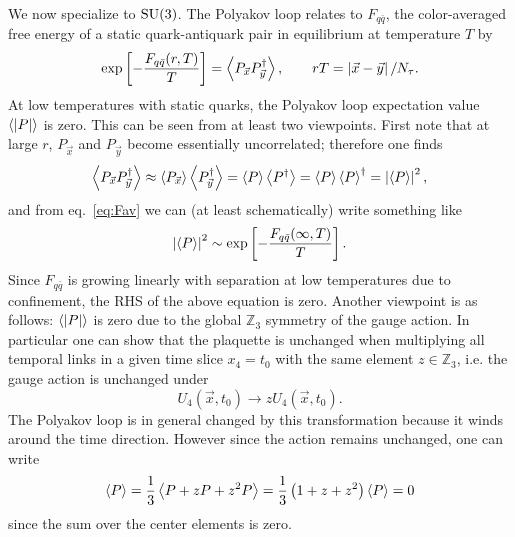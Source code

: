 We now specialize to $\operatorname{SU}(3)$. The Polyakov loop relates to $F_{q\bar{q}}$,
the color-averaged free energy of a static quark-antiquark pair in
equilibrium at temperature $T$ by
\cite{mclerran_monte_1981,mclerran_quark_1981}
\begin{equation}\label{eq:Fav}
  \exp\left[-\frac{F_{q\bar{q}}(r,T)}{T}\right] 
    =\ev{P_{\vec{x}}P^\dagger_{\vec{y}}},
     \qquad rT=\left|\vec{x}-\vec{y}\tinysp\right|/N_\tau.
\end{equation}
At low temperatures with static quarks, the Polyakov loop expectation value
$\ev{|P|}$ is zero. This can be seen from at least two viewpoints. First
note that at large $r$, $P_{\vec{x}}$ and $P_{\vec{y}}$ become essentially
uncorrelated; therefore one finds
\begin{equation}\label{eq:ploop_decouple}
  \ev{P_{\vec{x}}P^\dagger_{\vec{y}}}
    \approx\ev{P_{\vec{x}}}\ev{P^\dagger_{\vec{y}}}
    =\ev{P}\ev{P^\dagger}
    =\ev{P}\ev{P}^\dagger
    =\left|\ev{P}\right|^2,
\end{equation}
and from eq.~\eqref{eq:Fav} we can (at least schematically) write
something like
\begin{equation}
  \left|\ev{P}\right|^2\sim\exp\left[-\frac{F_{q\bar{q}}(\infty,T)}{T}\right]. 
\end{equation}
Since $F_{q\bar{q}}$ is growing linearly with separation at low temperatures
due to confinement, the RHS of the above equation is zero.
Another viewpoint is as follows: $\ev{|P|}$ is zero due to the global
$\mathbb{Z}_3$ symmetry of the gauge action. In particular one can show
that the plaquette is unchanged when multiplying all temporal links in a
given time slice $x_4=t_0$ with the same element $z\in\mathbb{Z}_3$, i.e.
the gauge action is unchanged under
\begin{equation}
  U_4(\vec{x},t_0)\to zU_4(\vec{x},t_0).
\end{equation}
The Polyakov loop is in general changed by this transformation
because it winds around the time direction. However since the action remains
unchanged, one can write
\begin{equation}\label{eq:centerzero}
  \ev{P}=\frac{1}{3}\ev{P+zP+z^2P}=\frac{1}{3}\left(1+z+z^2\right)\ev{P}=0
\end{equation}
since the sum over the center elements is zero.


